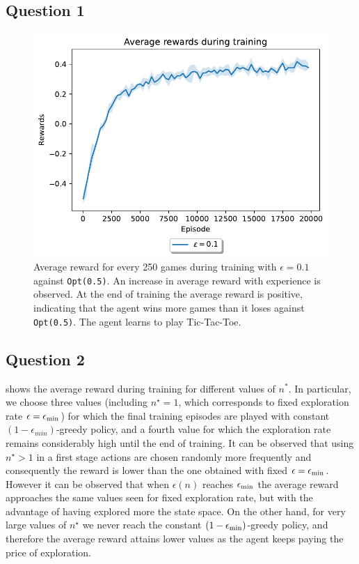 \documentclass[10pt]{IEEEtran}
\begin{document}
\subsection*{Question 1}
\begin{figure}[h]
    \centering
    \includegraphics[width = 0.85\linewidth]{code/figures/rewards_epsilon_exploration_Q1.pdf}
    \caption{Average reward for every 250 games during training with $\epsilon = 0.1$ against \texttt{Opt(0.5)}. An increase in average reward with experience is observed. At the end of training the average reward is positive, indicating that the agent wins more games than it loses against \texttt{Opt(0.5)}. The agent learns to play Tic-Tac-Toe.}
    \label{plot_question1}
\end{figure}

\subsection*{Question 2}
 shows the average reward during training for different values of $n^{*}$. In particular, we choose three values (including $n^{\star} = 1$, which corresponds to fixed exploration rate $\epsilon = \epsilon_{\text{min}}$) for which the final training episodes are played with constant $(1-\epsilon_{min})$-greedy policy, and a fourth value for which the exploration rate remains considerably high until the end of training. It can be observed that using $n^{\star} > 1$ in a first stage actions are chosen randomly more frequently and consequently the reward is lower than the one obtained with fixed $\epsilon = \epsilon_{\text{min}}$. However it can be observed that when $\epsilon(n)$ reaches $\epsilon_{\text{min}}$ the average reward approaches the same values seen for fixed exploration rate, but with the advantage of having explored more the state space. On the other hand, for very large values of $n^{\star}$ we never reach the constant $(1-\epsilon_{\text{min}})$-greedy policy, and therefore the average reward attains lower values as the agent keeps paying the price of exploration.
\end{document}
